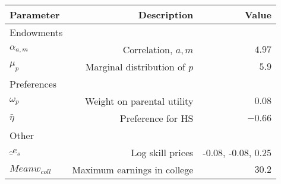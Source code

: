 \begin{tabular}{lrr}
\hline
Parameter & Description  & Value  \\
\hline
Endowments &   &   \\
$\alpha_{a,m}$ & Correlation, $a,m$  & $4.97$  \\
$\mu_{p}$ & Marginal distribution of $p$  & $5.9$  \\
Preferences &   &   \\
$\omega_{p}$ & Weight on parental utility  & $0.08$  \\
$\bar{\eta}$ & Preference for HS  & $-0.66$  \\
Other &   &   \\
$\hat_{e}_{s}$ & Log skill prices  & -0.08, -0.08, 0.25  \\
$Mean w_{coll}$ & Maximum earnings in college  & $30.2$  \\
\hline
\end{tabular}%
